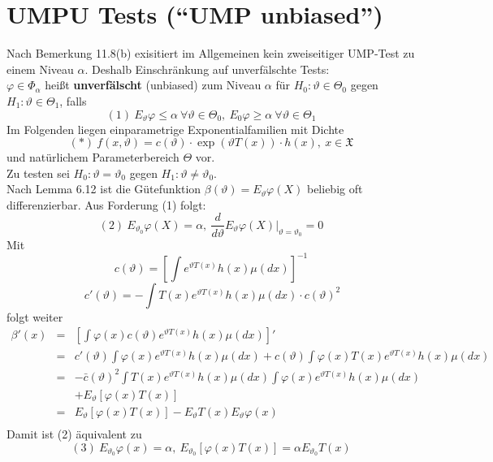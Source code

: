 \documentclass[a4paper,11pt,twoside,titlepage]{article}
\newcommand{\XX}{{\mathfrak X}} %
\begin{document}
\section{UMPU Tests ("`UMP unbiased"')}
Nach Bemerkung 11.8(b) exisitiert im Allgemeinen kein zweiseitiger
UMP-Test zu einem Niveau $\alpha$. Deshalb Einschränkung auf unverfälschte
Tests:\\
$\varphi\in\Phi_\alpha$ heißt \textbf{unverfälscht} (unbiased)
zum Niveau $\alpha$ für $H_0:\vartheta\in\Theta_0$ gegen $H_1:\vartheta\in\Theta_1$, falls
$$(1)\ E_\vartheta\varphi\leq\alpha\ \forall\vartheta\in\Theta_0,\ E_0\varphi\geq\alpha\ \forall \vartheta\in\Theta_1$$
Im Folgenden liegen einparametrige Exponentialfamilien mit Dichte
$$(\ast)\ f(x,\vartheta)=c(\vartheta)\cdot\exp(\vartheta T(x))\cdot h(x),\ x\in\XX$$
und natürlichem Parameterbereich $\Theta$ vor.\\
Zu testen sei $H_0: \vartheta=\vartheta_0$ gegen $H_1: \vartheta\neq\vartheta_0$.\\
Nach Lemma 6.12 ist die Gütefunktion $\beta(\vartheta)=E_\vartheta\varphi(X)$ beliebig oft differenzierbar. Aus Forderung (1) folgt:
$$(2)\ E_{\vartheta_0}\varphi(X)=\alpha,\ \frac{d}{d\vartheta}E_\vartheta\varphi(X)|_{\vartheta=\vartheta_0}=0$$
Mit $$c(\vartheta)=[\int e^{\vartheta T(x)}h(x)\mu(dx)]^{-1}$$
$$\ c'(\vartheta)=-\int T(x)e^{\vartheta T(x)}h(x)\mu(dx)\cdot c(\vartheta)^2$$ folgt weiter
\begin{eqnarray*}
\beta'(x)&=&[\int \varphi(x)c(\vartheta)e^{\vartheta T(x)}h(x)\mu(dx)]'\\
&=&c'(\vartheta)\int \varphi(x)e^{\vartheta T(x)}h(x)\mu(dx)+c(\vartheta)\int \varphi(x)T(x)e^{\vartheta T(x)}h(x)\mu(dx)\\
&=&-\bar{c}(\vartheta)^2\int T(x)e^{\vartheta T(x)}h(x)\mu(dx)\int\varphi(x)e^{\vartheta T(x)}h(x)\mu(dx)\\
&&+E_\vartheta[\varphi(x)T(x)]\\
&=&E_\vartheta[\varphi(x)T(x)]-E_\vartheta T(x)E_\vartheta\varphi(x)\\
\end{eqnarray*}
Damit ist (2) äquivalent zu
$$(3)\ E_{\vartheta_0}\varphi(x)=\alpha,\ E_{\vartheta_0}[\varphi(x)T(x)]=\alpha E_{\vartheta_0}T(x)$$
\end{document}
